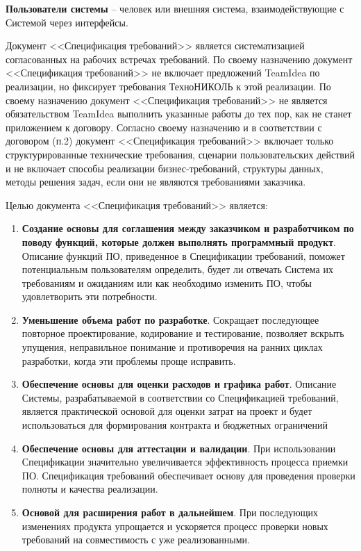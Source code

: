 \textbf{Пользователи системы} -- человек или внешняя система, взаимодействующие с Системой через интерфейсы.



Документ <<Спецификация требований>> является систематизацией согласованных на рабочих встречах требований. По своему назначению документ <<Спецификация требований>>  не включает предложений TeamIdea по реализации, но фиксирует требования ТехноНИКОЛЬ к этой реализации. По своему назначению документ <<Спецификация требований>> не является обязательством TeamIdea выполнить указанные работы до тех пор, как не станет приложением к договору. Согласно своему назначению и в соответствии с договором (п.2) документ <<Спецификация требований>> включает только структурированные технические требования, сценарии пользовательских действий и не включает способы реализации бизнес-требований, структуры данных, методы решения задач, если они не являются требованиями заказчика. 


Целью документа <<Спецификация требований>> является:

\begin{enumerate}
\item \textbf{Создание основы для соглашения между заказчиком и разработчиком по поводу функций, которые должен выполнять программный продукт}. Описание функций ПО, приведенное в Спецификации требований, поможет потенциальным пользователям определить, будет ли отвечать Система их требованиям и ожиданиям или как необходимо изменить ПО, чтобы удовлетворить эти потребности. 
\item \textbf{Уменьшение объема работ по разработке}. Сокращает последующее повторное проектирование, кодирование и тестирование, позволяет вскрыть упущения, неправильное понимание и противоречия на ранних циклах разработки, когда эти проблемы проще исправить.
\item \textbf{Обеспечение основы для оценки расходов и графика работ}. Описание Системы, разрабатываемой в соответствии со Спецификацией требований, является практической основой для оценки затрат на проект и будет использоваться для формирования контракта и бюджетных ограничений
\item \textbf{Обеспечение основы для аттестации и валидации}. При использовании Спецификации значительно увеличивается эффективность процесса приемки ПО. Спецификация требований обеспечивает основу для проведения проверки полноты и качества реализации.
\item \textbf{Основой для расширения работ в дальнейшем}. При последующих изменениях продукта упрощается и ускоряется процесс проверки новых требований на совместимость с уже реализованными.  
\end{enumerate}

